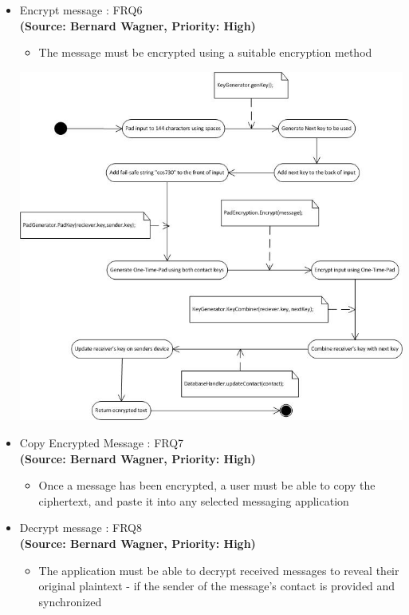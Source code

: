 \begin{itemize}
\newpage
\item{Encrypt message : FRQ6}\\
\textbf{(Source: Bernard Wagner, Priority: High)}
\begin{itemize}
\item The message must be encrypted using a suitable encryption method
\end{itemize}
 \includegraphics[width=13cm]{diagrams/StateDiagrams/EncryptMessageStateDiagram.png}
\item{Copy Encrypted Message : FRQ7}\\
\textbf{(Source: Bernard Wagner, Priority: High)}
\begin{itemize}
\item Once a message has been encrypted, a user must be able to copy the ciphertext, and paste it into any selected messaging application
\end{itemize}
\newpage
\item{Decrypt message : FRQ8}\\
\textbf{(Source: Bernard Wagner, Priority: High)}
\begin{itemize}
\item The application must be able to decrypt received messages to reveal their original plaintext - if the sender of the message's contact is provided and synchronized
\end{itemize}

\end{itemize}
